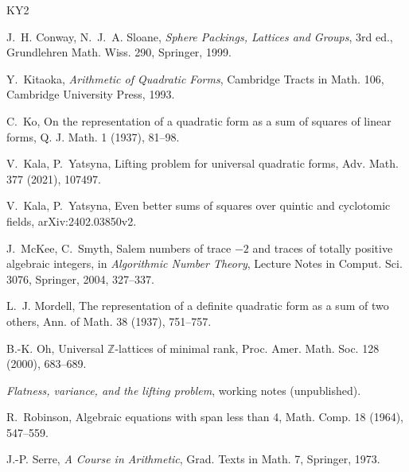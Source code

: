 \documentclass[11pt]{amsart}
\theoremstyle{definition}
\newcommand{\Z}{\mathbb{Z}}
\begin{document}
\begin{thebibliography}{KY2}

J.~H. Conway, N.~J.~A. Sloane,
\emph{Sphere Packings, Lattices and Groups}, 3rd ed., Grundlehren Math. Wiss. 290,
Springer, 1999.

Y.~Kitaoka, \emph{Arithmetic of Quadratic Forms}, Cambridge Tracts in Math. 106,
Cambridge University Press, 1993.

C.~Ko, On the representation of a quadratic form as a sum of squares of linear forms,
Q. J. Math. 1 (1937), 81--98.

V.~Kala, P.~Yatsyna, Lifting problem for universal quadratic forms,
Adv. Math. 377 (2021), 107497.

V.~Kala, P.~Yatsyna, Even better sums of squares over quintic and cyclotomic fields,
arXiv:2402.03850v2.

J.~McKee, C.~Smyth, Salem numbers of trace $-2$ and traces of totally positive algebraic
integers, in \emph{Algorithmic Number Theory}, Lecture Notes in Comput. Sci. 3076,
Springer, 2004, 327--337.

L.~J. Mordell, The representation of a definite quadratic form as a sum of two others,
Ann. of Math. 38 (1937), 751--757.

B.-K. Oh, Universal $\Z$-lattices of minimal rank, Proc. Amer. Math. Soc. 128 (2000),
683--689.

\emph{Flatness, variance, and the lifting problem}, working notes (unpublished).

R.~Robinson, Algebraic equations with span less than 4, Math. Comp. 18 (1964), 547--559.

J.-P. Serre, \emph{A Course in Arithmetic}, Grad. Texts in Math. 7, Springer, 1973.

\end{thebibliography}
\end{document}
